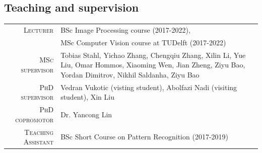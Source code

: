\documentclass[a4paper, oneside, final]{scrartcl}
\begin{document}
\begin{center}
		\section{Teaching and supervision}
		\begin{tabular}{r@{\hskip 0.3in}p{12.3cm}}
			\textsc{Lecturer}		            & BSc Image Processing course (2017-2022),\\
                                                & MSc Computer Vision course at TUDelft (2017-2022)\\
			\textsc{MSc supervisor}             & Tobias Stahl, Yichao Zhang, Chengqiu Zhang, Xilin Li, Yue Liu, Omar Hommos, Xiaoming Wen, Jian Zheng, Ziyu Bao, Yordan Dimitrov, Nikhil Saldanha, Ziyu Bao\\
			\textsc{PhD supervisor}             & Vedran Vukotic (visting student), Abolfazi Nadi (visiting student), Xin Liu\\ 
			\textsc{PhD copromotor}             & Dr. Yancong Lin\\ 
            \textsc{Teaching Assistant}         & BSc Short Course on Pattern Recognition (2017-2019)\\
		\end{tabular}

\end{center}
\end{document}
